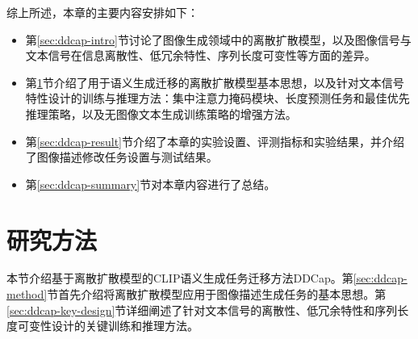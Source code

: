 综上所述，本章的主要内容安排如下：
\begin{itemize}
    \item 第\ref{sec:ddcap-intro}节讨论了图像生成领域中的离散扩散模型，以及图像信号与文本信号在信息离散性、低冗余特性、序列长度可变性等方面的差异。
    \item 第\ref{sec:ddcap-method-all}节介绍了用于语义生成迁移的离散扩散模型基本思想，以及针对文本信号特性设计的训练与推理方法：集中注意力掩码模块、长度预测任务和最佳优先推理策略，以及无图像文本生成训练策略的增强方法。
    \item 第\ref{sec:ddcap-result}节介绍了本章的实验设置、评测指标和实验结果，并介绍了图像描述修改任务设置与测试结果。
    \item 第\ref{sec:ddcap-summary}节对本章内容进行了总结。
\end{itemize}




\section{研究方法}
\label{sec:ddcap-method-all}
本节介绍基于离散扩散模型的CLIP语义生成任务迁移方法DDCap。第\ref{sec:ddcap-method}节首先介绍将离散扩散模型应用于图像描述生成任务的基本思想。第\ref{sec:ddcap-key-design}节详细阐述了针对文本信号的离散性、低冗余特性和序列长度可变性设计的关键训练和推理方法。


